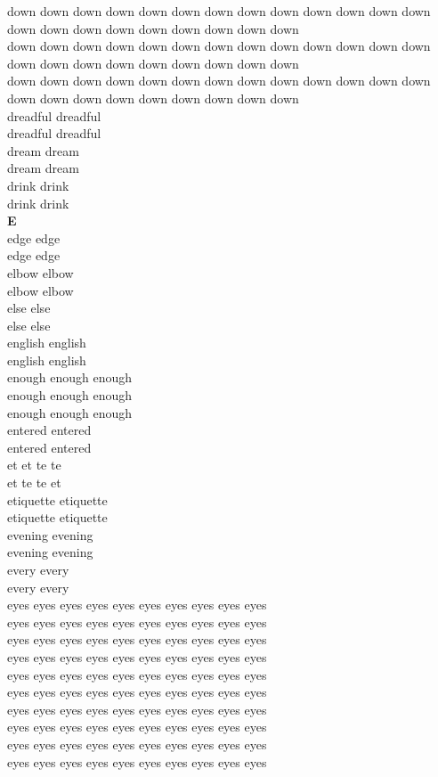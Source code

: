 down down down down down down down down down down down down down down down down down down down down down down\\
down down down down down down down down down down down down down down down down down down down down down down\\
down down down down down down down down down down down down down down down down down down down down down down\\
dreadful dreadful\\
dreadful dreadful\\
dream dream\\
dream dream\\
drink drink\\
drink drink\\


\vspace{14pt}
\noindent\textbf{\Large E}\\[+12pt]
edge edge\\
edge edge\\
elbow elbow\\
elbow elbow\\
else else\\
else else\\
english english\\
english english\\
enough enough enough\\
enough enough enough\\
enough enough enough\\
entered entered\\
entered entered\\
et et te te\\
et te te et\\
etiquette etiquette\\
etiquette etiquette\\
evening evening\\
evening evening\\
every every\\
every every\\
eyes eyes eyes eyes eyes eyes eyes eyes eyes eyes\\
eyes eyes eyes eyes eyes eyes eyes eyes eyes eyes\\
eyes eyes eyes eyes eyes eyes eyes eyes eyes eyes\\
eyes eyes eyes eyes eyes eyes eyes eyes eyes eyes\\
eyes eyes eyes eyes eyes eyes eyes eyes eyes eyes\\
eyes eyes eyes eyes eyes eyes eyes eyes eyes eyes\\
eyes eyes eyes eyes eyes eyes eyes eyes eyes eyes\\
eyes eyes eyes eyes eyes eyes eyes eyes eyes eyes\\
eyes eyes eyes eyes eyes eyes eyes eyes eyes eyes\\
eyes eyes eyes eyes eyes eyes eyes eyes eyes eyes\\


